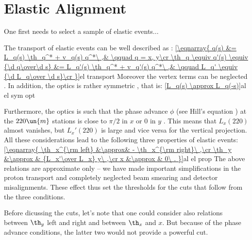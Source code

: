 



\section[al elast]{Elastic Alignment}

One first needs to select a sample of elastic events...

The transport of elastic events can be well described as :
\eqref{\eqnarray{
q(s) &= L_q(s) \th_q^* + v_q(s) q^*\ ,& \qquad q = x, y\cr
\th_q \equiv q'(s) \equiv {\d q\over\d s} &= L_q'(s) \th_q^* + v_q'(s) q^*\ ,& \qquad L_q' \equiv {\d L_q\over \d s}\cr
}}{el transport}
Moreover the vertex terms can be neglected . In addition, the optics is rather symmetric , that is:
\eqref{L_q(s) \approx L_q(-s)}{al el sym opt}

Furthermore, the optics is such that the phase advance $\phi$ (see Hill's equation ) at the $220\un{m}$ stations is close to $\pi/2$ in $x$ or $0$ in $y$ . This means that $L_x(220)$ almost vanishes, but $L_x'(220)$ is large and vice versa for the vertical projection. All these considerations lead to the following three properties of elastic events:
\eqref{\eqnarray{
\th_x^{\rm left} &\approx& - \th_x^{\rm right}\ ,\cr
\th_y &\approx & {L_x'\over L_x} y\ ,\cr
x &\approx & 0\ .
}}{al el prop}
The above relations are approximate only -- we have made important simplifications in the proton transport and completely neglected beam smearing and detector misalignments. These effect thus set the thresholds for the cuts that follow from the three conditions.

Before dicussing the cuts, let's note that one could consider also relations between $\th_y$ left and right and between $\th_x$ and $x$. But because of the phase advance conditions, the latter two would not provide a powerful cut.

